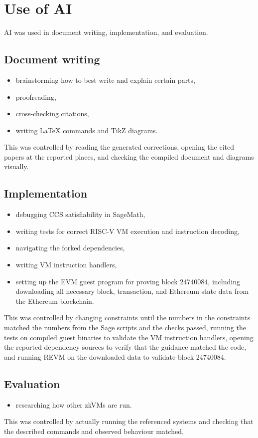 \chapter*{Use of AI}

AI was used in document writing, implementation, and evaluation.

\section{Document writing}

\begin{itemize}
	\item brainstorming how to best write and explain certain parts,
	\item proofreading,
	\item cross-checking citations,
	\item writing LaTeX commands and TikZ diagrams.
\end{itemize}

This was controlled by reading the generated corrections, opening the cited papers
at the reported places, and checking the compiled document and diagrams visually.

\section{Implementation}

\begin{itemize}
	\item debugging CCS satisfiability in SageMath,
	\item writing tests for correct RISC-V VM execution and instruction decoding,
	\item navigating the forked dependencies,
	\item writing VM instruction handlers,
	\item setting up the EVM guest program for proving block 24740084,
	      including downloading all necessary block, transaction, and Ethereum state data
	      from the Ethereum blockchain.
\end{itemize}

This was controlled by changing constraints until the numbers in the constraints
matched the numbers from the Sage scripts and the checks passed, running the
tests on compiled guest binaries to validate the VM instruction handlers,
opening the reported dependency sources to verify that the guidance matched the
code, and running REVM on the downloaded data to validate block 24740084.

\section{Evaluation}

\begin{itemize}
	\item researching how other zkVMs are run.
\end{itemize}

This was controlled by actually running the referenced systems and checking that
the described commands and observed behaviour matched.
